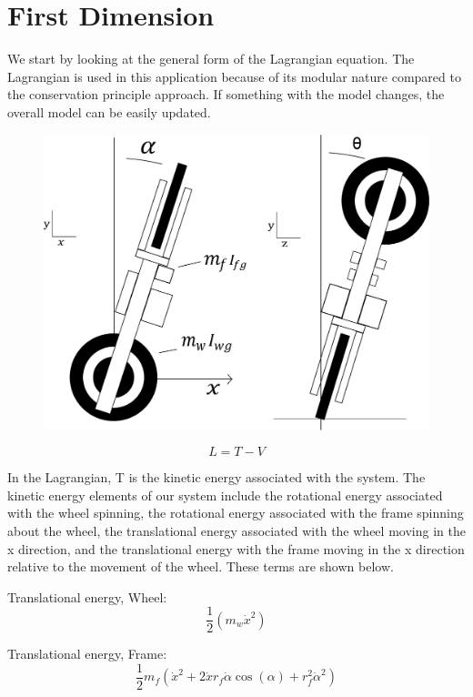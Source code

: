 \documentclass{article}
\begin{document}
\section{First Dimension}
We start by looking at the general form of the Lagrangian equation.  The Lagrangian is used in this application because of its modular nature compared to the conservation principle approach.  If something with the model changes, the overall model can be easily updated.

\begin{figure}[h]
\centering
\includegraphics[scale=0.5]{systemDescriptioinDiagram}
\end{figure}


\begin{equation}
 L = T - V 
 \end{equation}
 
 In the Lagrangian, T is the kinetic energy associated with the system. The kinetic energy elements of our system include the rotational energy associated with the wheel spinning, the rotational energy associated with the frame spinning about the wheel, the translational energy associated with the wheel moving in the x direction, and the translational energy with the frame moving in the x direction relative to the movement of the wheel.  These terms are shown below.
 
 Translational energy, Wheel:
\begin{equation}
  \frac{1}{2} (m_{w} \dot{x}^2)
\end{equation}  

Translational energy, Frame:
\begin{equation}
\frac{1}{2} m_{f} (\dot{x}^2 + 2 \dot{x} r_{f} \dot{\alpha} \cos(\alpha)   + r_{f}^2 \dot{\alpha}^2)
\end{equation}
\end{document}
